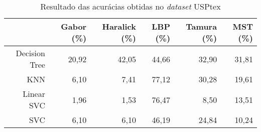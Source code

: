 \begin{table}[H]
    \centering
    \caption[Resultado das acurácias obtidas no USPtex]{Resultado das acurácias obtidas no \textit{dataset} USPtex
    \label{tab:USPtexAcuracias}}
    \begin{tabular}{rrrrrr}
        \toprule
            & Gabor (\%) & Haralick (\%) & LBP (\%) & Tamura (\%) & MST (\%) \\
        \midrule
            Decision Tree & 20,92 & 42,05 & 44,66 & 32,90 & 31,81 \\
            KNN & 6,10 & 7,41 & 77,12 & 30,28 & 19,61 \\
            Linear SVC & 1,96 & 1,53 & 76,47 & 8,50 & 13,51 \\
            SVC & 6,10 & 6,10 & 46,19 & 24,84 & 10,24 \\
        \bottomrule
    \end{tabular}
\end{table}

